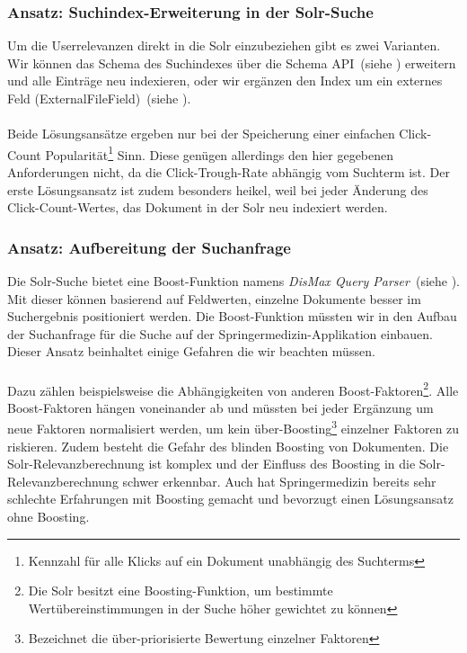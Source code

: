 \subsubsection{Ansatz: Suchindex-Erweiterung in der Solr-Suche}
\label{sec:Reranking:Methodik:SucheEinbinden:SolrSuche}

Um die Userrelevanzen direkt in die Solr einzubeziehen gibt es zwei Varianten. Wir können das Schema des Suchindexes über die Schema API~(siehe \cite{SchemaAPISolr}) erweitern und alle Einträge neu indexieren, oder wir ergänzen den Index um ein externes Feld (ExternalFileField)~(siehe \cite{ExtFieldSolr}).
\\
\\
Beide Lösungsansätze ergeben nur bei der Speicherung einer einfachen Click-Count Popularität\footnote{Kennzahl für alle Klicks auf ein Dokument unabhängig des Suchterms} Sinn. Diese genügen allerdings den hier gegebenen Anforderungen nicht, da die Click-Trough-Rate abhängig vom Suchterm ist. Der erste Lösungsansatz ist zudem besonders heikel, weil bei jeder Änderung des Click-Count-Wertes, das Dokument in der Solr neu indexiert werden.

\subsubsection{Ansatz: Aufbereitung der Suchanfrage}
\label{sec:Reranking:Methodik:SucheEinbinden:Suchanfrage}

Die Solr-Suche bietet eine Boost-Funktion namens \textit{DisMax Query Parser}~(siehe \cite{DisMax}). Mit dieser können basierend auf Feldwerten, einzelne Dokumente besser im Suchergebnis positioniert werden. Die Boost-Funktion müssten wir in den Aufbau der Suchanfrage für die Suche auf der Springermedizin-Applikation einbauen. Dieser Ansatz beinhaltet einige Gefahren die wir beachten müssen.
\\
\\
Dazu zählen beispielsweise die Abhängigkeiten von anderen Boost-Faktoren\footnote{Die Solr besitzt eine Boosting-Funktion, um bestimmte Wertübereinstimmungen in der Suche höher gewichtet zu können}. Alle Boost-Faktoren hängen voneinander ab und müssten bei jeder Ergänzung um neue Faktoren normalisiert werden, um kein \glqq über-Boosting\grqq{}\footnote{Bezeichnet die über-priorisierte Bewertung einzelner Faktoren} einzelner Faktoren zu riskieren. Zudem besteht die Gefahr des \glqq blinden Boosting\grqq{} von Dokumenten. Die Solr-Relevanzberechnung ist komplex und der Einfluss des \glqq Boosting\grqq{} in die Solr-Relevanzberechnung schwer erkennbar. Auch hat Springermedizin bereits sehr schlechte Erfahrungen mit \glqq Boosting\grqq{} gemacht und bevorzugt einen Lösungsansatz ohne \glqq Boosting\grqq{}.


